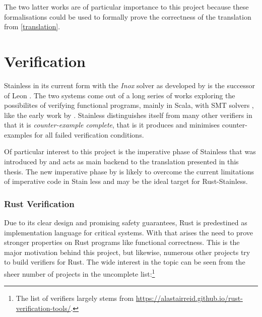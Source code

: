 The two latter works are of particular importance to this project because these
formalisations could be used to formally prove the correctness of the
translation from \autoref{translation}.

\section{Verification}

Stainless in its current form with the \emph{Inox} solver \cite{inox} as
developed by \citet*{stainless} is the successor of Leon \cite{leon}. The two
systems come out of a long series of works exploring the possibilites of
verifying functional programs, mainly in Scala, with SMT solvers \cite{smt},
like the early work by \citet{smrp}. Stainless distinguishes itself from many
other verifiers in that it is \emph{counter-example complete}, that is it
produces and minimises counter-examples for all failed verification conditions.

Of particular interest to this project is the imperative phase of Stainless that
was introduced by \citet{regb} and acts as main backend to the translation
presented in this thesis. The new imperative phase by \citet{new-imperative} is
likely to overcome the current limitations of imperative code in Stain less and
may be the ideal target for Rust-Stainless.

\subsubsection{Rust Verification}

Due to its clear design and promising safety guarantees, Rust is predestined as
implementation language for critical systems. With that arises the need to prove
stronger properties on Rust programs like functional correctness. This is the
major motivation behind this project, but likewise, numerous other projects try
to build verifiers for Rust. The wide interest in the topic can be seen from the
sheer number of projects in the uncomplete list:\footnote{The list of verifiers
largely stems from
\url{https://alastairreid.github.io/rust-verification-tools/}.}

